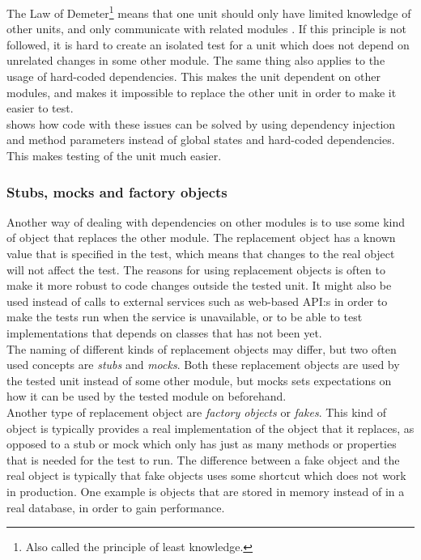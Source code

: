 The Law of Demeter\footnote{Also called the principle of least
knowledge.} means that one unit should only have limited knowledge of
other units, and only communicate with related modules
\cite{wiki:demeter}. If this principle is not followed, it is hard to
create an isolated test for a unit which does not depend on unrelated
changes in some other module. The same thing also applies to the usage
of hard-coded dependencies. This makes the unit dependent on other
modules, and makes it impossible to replace the other unit in order to
make it easier to test.\\

\citeauthor{video:misko_psychology} shows how code with these issues can
be solved by using dependency injection and method parameters instead
of global states and hard-coded dependencies. This makes testing of the
unit much easier.\\


\subsubsection{Stubs, mocks and factory objects}
\label{sec:theory_mocks}

Another way of dealing with dependencies on other modules is to use some
kind of object that replaces the other module. The replacement object
has a known value that is specified in the test, which means that
changes to the real object will not affect the test. The reasons for
using replacement objects is often to make it more robust to code
changes outside the tested unit. It might also be used instead of calls
to external services such as web-based API:s in order to make the tests
run when the service is unavailable, or to be able to test
implementations that depends on classes that has not been yet.\\

The naming of different kinds of replacement objects may differ, but two
often used concepts are \emph{stubs} and \emph{mocks}. Both these
replacement objects are used by the tested unit instead of some other
module, but mocks sets expectations on how it can be used by the tested
module on beforehand. \cite{web:mocks_arent_stubs}\\

Another type of replacement object are \emph{factory objects} or
\emph{fakes}. This kind of object is typically provides a real
implementation of the object that it replaces, as opposed to a stub or
mock which only has just as many methods or properties that is needed
for the test to run. The difference between a fake object and the real
object is typically that fake objects uses some shortcut which does not
work in production. One example is objects that are stored in memory
instead of in a real database, in order to gain performance.
\cite{web:mocks_arent_stubs}\\

